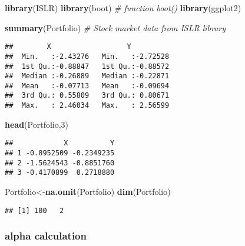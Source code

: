 \documentclass[]{article}
\newenvironment{Shaded}{\begin{snugshade}}{\end{snugshade}}
\newcommand{\KeywordTok}[1]{\textcolor[rgb]{0.13,0.29,0.53}{\textbf{#1}}}
\newcommand{\DecValTok}[1]{\textcolor[rgb]{0.00,0.00,0.81}{#1}}
\newcommand{\CommentTok}[1]{\textcolor[rgb]{0.56,0.35,0.01}{\textit{#1}}}
\newcommand{\NormalTok}[1]{#1}
\begin{document}
\begin{Shaded}
\begin{Highlighting}[]
\KeywordTok{library}\NormalTok{(ISLR)}
\KeywordTok{library}\NormalTok{(boot) }\CommentTok{# function boot()}
\KeywordTok{library}\NormalTok{(ggplot2)}
\end{Highlighting}
\end{Shaded}

\begin{Shaded}
\begin{Highlighting}[]
\KeywordTok{summary}\NormalTok{(Portfolio) }\CommentTok{# Stock market data from ISLR library}
\end{Highlighting}
\end{Shaded}

\begin{verbatim}
##        X                  Y           
##  Min.   :-2.43276   Min.   :-2.72528  
##  1st Qu.:-0.88847   1st Qu.:-0.88572  
##  Median :-0.26889   Median :-0.22871  
##  Mean   :-0.07713   Mean   :-0.09694  
##  3rd Qu.: 0.55809   3rd Qu.: 0.80671  
##  Max.   : 2.46034   Max.   : 2.56599
\end{verbatim}

\begin{Shaded}
\begin{Highlighting}[]
\KeywordTok{head}\NormalTok{(Portfolio,}\DecValTok{3}\NormalTok{)}
\end{Highlighting}
\end{Shaded}

\begin{verbatim}
##            X          Y
## 1 -0.8952509 -0.2349235
## 2 -1.5624543 -0.8851760
## 3 -0.4170899  0.2718880
\end{verbatim}

\begin{Shaded}
\begin{Highlighting}[]
\NormalTok{Portfolio<-}\KeywordTok{na.omit}\NormalTok{(Portfolio)}
\KeywordTok{dim}\NormalTok{(Portfolio)}
\end{Highlighting}
\end{Shaded}

\begin{verbatim}
## [1] 100   2
\end{verbatim}

\subsubsection{alpha calculation}\label{alpha-calculation}
\end{document}
